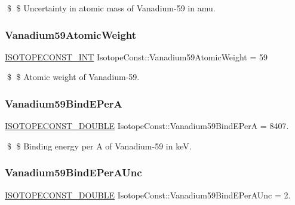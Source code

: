 \$ \$ Uncertainty in atomic mass of Vanadium-\/59 in amu. \mbox{\label{group___isotope_const-_vanadium-_v59_ga529fbee0a627ebeaa6d43ffa6ba3124f}} 
\subsubsection{\texorpdfstring{Vanadium59\+Atomic\+Weight}{Vanadium59AtomicWeight}}
{\footnotesize\ttfamily \mbox{\hyperlink{group___isotope_const-_macros_ga5f18360b3e99483a35c32d789e62621c}{I\+S\+O\+T\+O\+P\+E\+C\+O\+N\+S\+T\+\_\+\+I\+NT}} Isotope\+Const\+::\+Vanadium59\+Atomic\+Weight = 59}

\$ \$ Atomic weight of Vanadium-\/59. \mbox{\label{group___isotope_const-_vanadium-_v59_gac89d9ac1e801407fee707faf798c95c7}} 
\subsubsection{\texorpdfstring{Vanadium59\+Bind\+E\+PerA}{Vanadium59BindEPerA}}
{\footnotesize\ttfamily \mbox{\hyperlink{group___isotope_const-_macros_ga8f45a7272ce02c0b4c65c44636ed719a}{I\+S\+O\+T\+O\+P\+E\+C\+O\+N\+S\+T\+\_\+\+D\+O\+U\+B\+LE}} Isotope\+Const\+::\+Vanadium59\+Bind\+E\+PerA = 8407.}

\$ \$ Binding energy per A of Vanadium-\/59 in keV. \mbox{\label{group___isotope_const-_vanadium-_v59_ga3571e3e1d11e7fab6da68bf70d9bd4cf}} 
\subsubsection{\texorpdfstring{Vanadium59\+Bind\+E\+Per\+A\+Unc}{Vanadium59BindEPerAUnc}}
{\footnotesize\ttfamily \mbox{\hyperlink{group___isotope_const-_macros_ga8f45a7272ce02c0b4c65c44636ed719a}{I\+S\+O\+T\+O\+P\+E\+C\+O\+N\+S\+T\+\_\+\+D\+O\+U\+B\+LE}} Isotope\+Const\+::\+Vanadium59\+Bind\+E\+Per\+A\+Unc = 2.}

